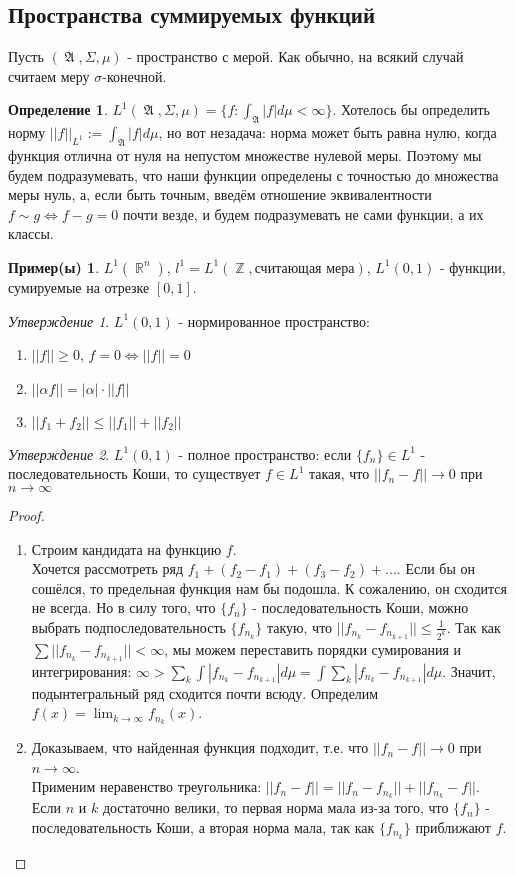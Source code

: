 \documentclass[a4paper]{article}
\theoremstyle{indented}
\theoremstyle{definition}
\newtheorem{defn}{Определение}
\newtheorem{exl}{Пример(ы)}
\theoremstyle{remark}
\newtheorem{stat}{Утверждение}
\DeclareMathOperator{\ra}{\rightarrow}
\DeclareMathOperator{\ZZ}{\mathbb{Z}}
\DeclareMathOperator{\RR}{\mathbb{R}}
\DeclareMathOperator{\GA}{\mathfrak{A}}
\begin{document}
\subsection{Пространства суммируемых функций}
Пусть $(\GA, \Sigma, \mu)$ - пространство с мерой. Как обычно, на всякий случай считаем меру $\sigma$-конечной.
\begin{defn}
$L^1(\GA, \Sigma, \mu) = \{f : \int_{\GA} |f| d \mu < \infty\}$. Хотелось бы определить норму $||f||_{L^1}:= \int_{\GA} |f| d \mu$, но вот незадача: норма может быть равна нулю, когда функция отлична от нуля на непустом множестве нулевой меры. Поэтому мы будем подразумевать, что наши функции определены с точностью до множества меры нуль, а, если быть точным, введём отношение эквивалентности $f \sim g \iff f-g=0$ почти везде, и будем подразумевать не сами функции, а их классы.
\end{defn}
\begin{exl}
$L^1(\RR^n)$, $l^1 = L^1(\ZZ, \text{считающая мера})$, $L^1(0, 1)$ - функции, сумируемые на отрезке $[0, 1]$.
\end{exl}
\begin{stat}
$L^1(0, 1)$ - нормированное пространство:
\begin{enumerate}
    \item $||f|| \geq 0$, $f=0 \iff ||f||=0$
    \item $||\alpha f|| = |\alpha| \cdot ||f||$
    \item $||f_1+f_2|| \leq ||f_1||+||f_2||$
\end{enumerate}
\end{stat}
\begin{stat}
$L^1(0, 1)$ - полное пространство: если $\{f_n\} \in L^1$ - последовательность Коши, то существует $f \in L^1$ такая, что $||f_n-f|| \ra 0$ при $n \ra \infty$ 
\end{stat}
\begin{proof}
\begin{enumerate}
    \item Строим кандидата на функцию $f$.
    \\
     Хочется рассмотреть ряд $f_1+(f_2-f_1)+(f_3-f_2)+...$. Если бы он сошёлся, то предельная функция нам бы подошла. К сожалению, он сходится не всегда. Но в силу того, что $\{f_n\}$ - последовательность Коши, можно выбрать подпоследовательность $\{f_{n_k}\}$ такую, что $||f_{n_k}-f_{n_{k+1}}||\leq \frac{1}{2^k}$. Так как $\sum ||f_{n_k}-f_{n_{k+1}}||<\infty$, мы можем переставить порядки сумирования и интегрирования: $\infty > \sum_k \int |f_{n_k}-f_{n_{k+1}}| d \mu = \int \sum_k |f_{n_k}-f_{n_{k+1}}| d \mu$. Значит, подынтегральный ряд сходится почти всюду. Определим $f(x) = \lim_{k \ra \infty} f_{n_k}(x)$.
    \item Доказываем, что найденная функция подходит, т.е. что $||f_n-f|| \ra 0$ при $n \ra \infty$.
    \\
    Применим неравенство треугольника: $||f_n-f|| = ||f_n-f_{n_k}||+||f_{n_k}-f||$. Если $n$ и $k$ достаточно велики, то первая норма мала из-за того, что $\{f_n\}$ - последовательность Коши, а вторая норма мала, так как $\{f_{n_k}\}$ приближают $f$.
\end{enumerate}
\end{proof}
\end{document}
